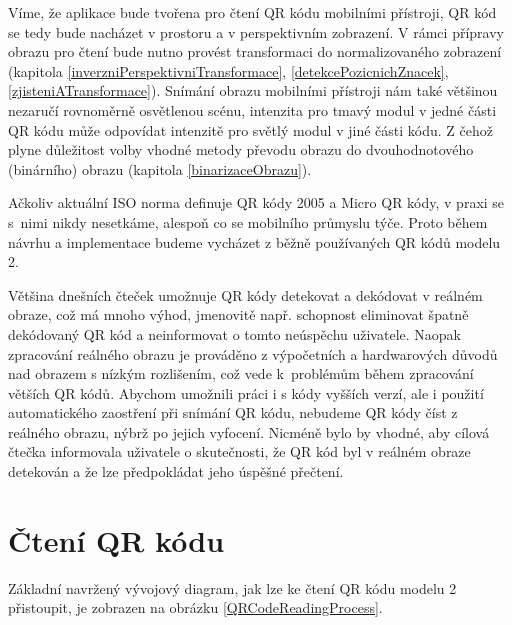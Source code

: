 Víme, že aplikace bude tvořena pro čtení QR kódu mobilními přístroji, QR kód
se tedy bude nacházet v prostoru a v perspektivním zobrazení. V rámci přípravy
obrazu pro čtení bude nutno provést transformaci do normalizovaného zobrazení
(kapitola \ref{inverzniPerspektivniTransformace},
\ref{detekcePozicnichZnacek}, \ref{zjisteniATransformace}). Snímání obrazu
mobilními přístroji nám také většinou nezaručí rovnoměrně osvětlenou scénu, intenzita pro tmavý modul v jedné části QR kódu může odpovídat intenzitě pro světlý modul v jiné části kódu. Z čehož plyne
důležitost volby vhodné metody převodu obrazu do dvouhodnotového (binárního)
obrazu (kapitola \ref{binarizaceObrazu}).

Ačkoliv aktuální ISO norma definuje QR kódy 2005 a Micro QR kódy, v praxi se
s~nimi nikdy nesetkáme, alespoň co se mobilního průmyslu týče. Proto během návrhu a implementace budeme vycházet z běžně používaných QR kódů modelu 2.

Většina dnešních čteček umožnuje QR kódy detekovat a dekódovat v reálném 
obraze, což má mnoho výhod, jmenovitě např. schopnost eliminovat špatně
dekódovaný QR kód a neinformovat o tomto neúspěchu uživatele. Naopak zpracování reálného
obrazu je prováděno z výpočetních a hardwarových důvodů nad obrazem s nízkým
rozlišením, což vede k~problémům během zpracování větších QR kódů. Abychom
umožnili práci i s kódy vyšších verzí, ale i použití automatického zaostření
při snímání QR kódu, nebudeme QR kódy číst z reálného obrazu, nýbrž po jejich
vyfocení. Nicméně bylo by vhodné, aby cílová čtečka informovala uživatele o
skutečnosti, že QR kód byl v reálném obraze detekován a že lze předpokládat
jeho úspěšné přečtení.

\section{Čtení QR kódu}
\label{cteniQRKodu}

Základní navržený vývojový diagram, jak lze ke čtení QR kódu modelu 2
přistoupit, je zobrazen na obrázku \ref{QRCodeReadingProcess}.


